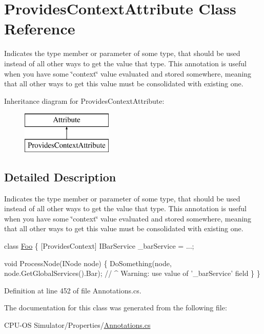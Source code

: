 \hypertarget{class_provides_context_attribute}{}\section{Provides\+Context\+Attribute Class Reference}
\label{class_provides_context_attribute}


Indicates the type member or parameter of some type, that should be used instead of all other ways to get the value that type. This annotation is useful when you have some \char`\"{}context\char`\"{} value evaluated and stored somewhere, meaning that all other ways to get this value must be consolidated with existing one.  


Inheritance diagram for Provides\+Context\+Attribute\+:\begin{figure}[H]
\begin{center}
\leavevmode
\includegraphics[height=2.000000cm]{class_provides_context_attribute}
\end{center}
\end{figure}


\subsection{Detailed Description}
Indicates the type member or parameter of some type, that should be used instead of all other ways to get the value that type. This annotation is useful when you have some \char`\"{}context\char`\"{} value evaluated and stored somewhere, meaning that all other ways to get this value must be consolidated with existing one. 


\begin{DoxyCode}
\textcolor{keyword}{class }\hyperlink{_annotations_8cs_a710c2378b43f44cd4a9b365c85be5d6c}{Foo} \{
  [ProvidesContext] IBarService \_barService = ...;

  \textcolor{keywordtype}{void} ProcessNode(INode node) \{
    DoSomething(node, node.GetGlobalServices().Bar);
    \textcolor{comment}{//              ^ Warning: use value of '\_barService' field}
  \}
\}
\end{DoxyCode}


Definition at line 452 of file Annotations.\+cs.



The documentation for this class was generated from the following file\+:\begin{DoxyCompactItemize}
\item 
C\+P\+U-\/\+O\+S Simulator/\+Properties/\hyperlink{_annotations_8cs}{Annotations.\+cs}\end{DoxyCompactItemize}
